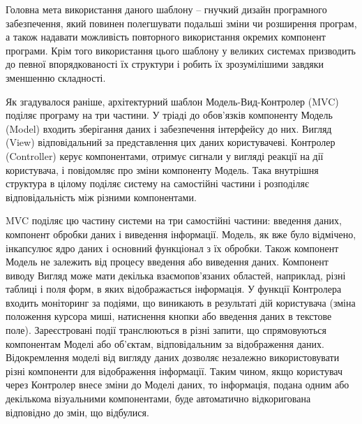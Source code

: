 \par Головна мета використання даного шаблону -- гнучкий дизайн програмного забезпечення, який повинен полегшувати подальші зміни чи розширення програм, а також надавати можливість повторного використання окремих компонент програми. 
Крім того використання цього шаблону у великих системах призводить до певної впорядкованості їх структури і робить їх зрозумілішими завдяки зменшенню складності.

\par Як згадувалося раніше, архітектурний шаблон Модель-Вид-Контролер (MVC) поділяє програму на три частини. У тріаді до обов'язків компоненту Модель (Model) входить зберігання даних і забезпечення інтерфейсу до них. Вигляд (View) відповідальний за представлення цих даних користувачеві. Контролер (Controller) керує компонентами, отримує сигнали у вигляді реакції на дії користувача, і повідомляє про зміни компоненту Модель. Така внутрішня структура в цілому поділяє систему на самостійні частини і розподіляє відповідальність між різними компонентами.
\par MVC поділяє цю частину системи на три самостійні частини: введення даних, компонент обробки даних і виведення інформації. Модель, як вже було відмічено, інкапсулює ядро даних і основний функціонал з їх обробки. Також компонент Модель не залежить від процесу введення або виведення даних. Компонент виводу Вигляд може мати декілька взаємопов'язаних областей, наприклад, різні таблиці і поля форм, в яких відображається інформація. У функції Контролера входить моніторинг за подіями, що виникають в результаті дій користувача (зміна положення курсора миші, натиснення кнопки або введення даних в текстове поле).
Зареєстровані події транслюються в різні запити, що спрямовуються компонентам Моделі або об'єктам, відповідальним за відображення даних. Відокремлення моделі від вигляду даних дозволяє незалежно використовувати різні компоненти для відображення інформації. Таким чином, якщо користувач через Контролер внесе зміни до Моделі даних, то інформація, подана одним або декількома візуальними компонентами, буде автоматично відкоригована відповідно до змін, що відбулися.


